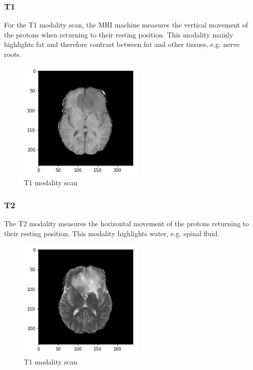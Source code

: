 \subsubsection{T1}
For the T1 modality scan, the MRI machine measures the vertical movement of the protons when returning to their resting position. This modality mainly highlights fat and therefore contrast between fat and other tissues, e.g. nerve roots\cite{mriquora}.
\begin{figure}[H]
\centering
\includegraphics[width=6cm]{chapters/06_hdm/c_Brats18_2013_17_1_L1/41.png}
\caption{T1 modality scan}
\end{figure}

\subsubsection{T2}
The T2 modality measures the horizontal movement of the protons returning to their resting position. This modality highlights water, e.g. spinal fluid.
\begin{figure}[H]
\centering
\includegraphics[width=6cm]{chapters/06_hdm/c_Brats18_2013_17_1_L1/51.png}
\caption{T1 modality scan}
\end{figure}

